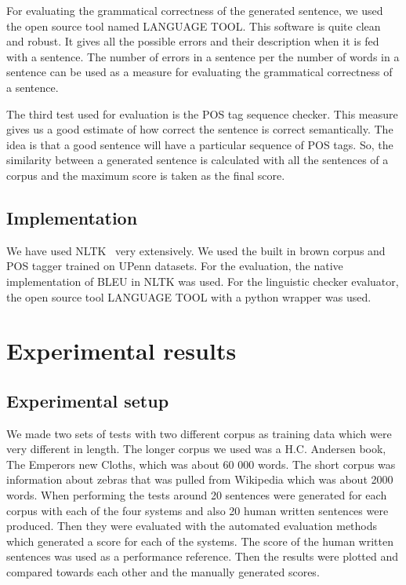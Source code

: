 \documentclass[a4paper,12pt]{article}
\begin{document}
For evaluating the grammatical correctness of the generated sentence, we used the
open source tool named LANGUAGE TOOL. This software is quite clean and robust. It gives 
all the possible errors and their description when it is fed with a sentence. The number 
of errors in a sentence per the number of words in a sentence can be used as a measure
for evaluating the grammatical correctness of a sentence.

The third test used for evaluation is the POS tag sequence checker. This measure 
gives us a good estimate of how correct the sentence is correct semantically. The idea
is that a good sentence will have a particular sequence of POS tags. So, the similarity
between a generated sentence is calculated with all the sentences of a corpus and the 
maximum score is taken as the final score. 

\subsection{Implementation}
\label{sec:impl}

We have used NLTK~\cite{nltk} very extensively. We used the built in brown
corpus and POS tagger trained on UPenn datasets. 
For the evaluation, the native implementation of BLEU in NLTK was used. 
For the linguistic checker evaluator, the open source tool LANGUAGE TOOL with a python
wrapper was used.

\section{Experimental results}
\label{sec:exps}

\subsection{Experimental setup}

We made two sets of tests with two different corpus as training data which were very different in length.
The longer corpus we used was a H.C. Andersen book, The Emperors new Cloths, which was about 60 000 words. 
The short corpus was information about zebras that was pulled from Wikipedia which was about 2000 words.
When performing the tests around 20 sentences were generated for each corpus with each of the four systems and also 20 human written sentences were produced. 
Then they were evaluated with the automated evaluation methods which generated a score for each of the systems.
The score of the human written sentences was used as a performance reference. Then the results were plotted and compared
towards each other and the manually generated scores.
\end{document}
